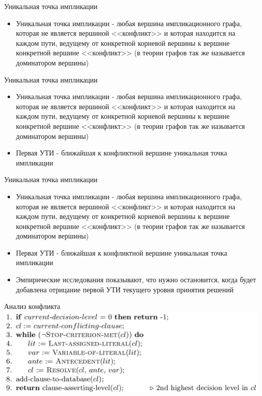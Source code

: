 \documentclass{beamer}
\begin{document}
\begin{frame}{Уникальная точка импликации}
\begin{itemize}
\item Уникальная точка импликации - любая вершина импликационного графа, которая не является вершиной <<конфликт>> и которая
находится на каждом пути, ведущему от конкретной корневой вершины к вершине конкретной вершине <<конфликт>> (в теории графов так
же называется доминатором вершины)
\end{itemize}
\end{frame}

\begin{frame}{Уникальная точка импликации}
\begin{itemize}
\item Уникальная точка импликации - любая вершина импликационного графа, которая не является вершиной <<конфликт>> и которая
находится на каждом пути, ведущему от конкретной корневой вершины к вершине конкретной вершине <<конфликт>> (в теории графов так
же называется доминатором вершины)
\item Первая УТИ - ближайшая к конфликтной вершине уникальная точка импликации
\end{itemize}
\end{frame}

\begin{frame}{Уникальная точка импликации}
\begin{itemize}
\item Уникальная точка импликации - любая вершина импликационного графа, которая не является вершиной <<конфликт>> и которая
находится на каждом пути, ведущему от конкретной корневой вершины к вершине конкретной вершине <<конфликт>> (в теории графов так
же называется доминатором вершины)
\item Первая УТИ - ближайшая к конфликтной вершине уникальная точка импликации
\item Эмпирические исследования показывают, что нужно остановится, когда будет добавлена отрицание первой УТИ текущего уровня
принятия решений
\end{itemize}
\end{frame}

\begin{frame}{Анализ конфликта}
\includegraphics[scale=0.4]{Analyze-Conflict.png}
\end{frame}
\end{document}
